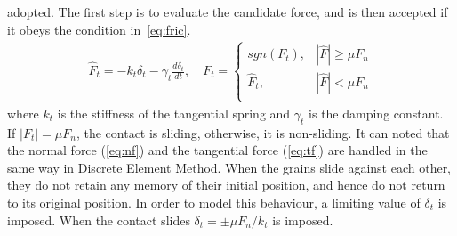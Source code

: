 adopted. The first step is to evaluate the candidate force, and is then 
accepted if it obeys the condition in~\cref{eq:fric}.
%
\begin{align}
 {\hat{F}_{t}}=-{{k}_{t}}{{\delta}_{t}}-{{\gamma}_{t}}\frac{d{{\delta}_{t}}}{dt},
  \quad F_{t}=
\begin{cases}
sgn(F_{t}), & {\left|\hat{F}\right|} \ge \mu F_{n} \\
{\hat{F}}_{t}, & {\left|\hat{F}\right|} < \mu F_{n} \\
\end{cases}
\label{eq:tf}
\end{align} 
%
where $k_{t}$ is the stiffness of the tangential spring and $\gamma_{t}$ is the 
damping constant. If $|F_{t}|=\mu F_{n}$, the contact is sliding, otherwise, it 
is non-sliding. It can noted that the normal force (\cref{eq:nf}) and the 
tangential force (\cref{eq:tf}) are handled in the same way in Discrete Element 
Method. When the grains slide against each other, they do not retain any memory 
of their initial position, and hence do not return to its original position. In 
order to model this behaviour, a limiting value of $\delta_{t}$ is imposed. 
When the contact slides $\delta_{t}=\pm\mu F_{n}/k_{t}$ is imposed.

